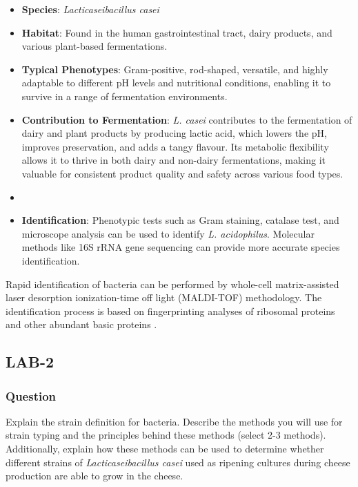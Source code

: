\begin{itemize}
    \item \textbf{Species}: \textit{Lacticaseibacillus casei}
    \item \textbf{Habitat}: Found in the human gastrointestinal tract, dairy products, and various plant-based fermentations.
    \item \textbf{Typical Phenotypes}: Gram-positive, rod-shaped, versatile, and highly adaptable to different pH levels and nutritional conditions, enabling it to survive in a range of fermentation environments.
    \item \textbf{Contribution to Fermentation}: \textit{L. casei} contributes to the fermentation of dairy and plant products by producing lactic acid, which lowers the pH, improves preservation, and adds a tangy flavour. Its metabolic flexibility allows it to thrive in both dairy and non-dairy fermentations, making it valuable for consistent product quality and safety across various food types.
    \item \item \textbf{Identification}: Phenotypic tests such as Gram staining, catalase test, and microscope analysis can be used to identify \textit{L. acidophilus}. Molecular methods like 16S rRNA gene sequencing can provide more accurate species identification.
\end{itemize}

\vspace*{0.5em}
Rapid identification of bacteria can be performed by whole-cell matrix-assisted laser desorption ionization-time off light (MALDI-TOF) methodology. The identification process is based on fingerprinting analyses of ribosomal proteins and other abundant basic proteins \cite*{L9-Coryn}.

\subsection{LAB-2}
\subsubsection*{Question}
Explain the strain definition for bacteria. Describe the methods you will use for strain typing and the principles behind these methods (select 2-3 methods). Additionally, explain how these methods can be used to determine whether different strains of \textit{Lacticaseibacillus casei} used as ripening cultures during cheese production are able to grow in the cheese.

